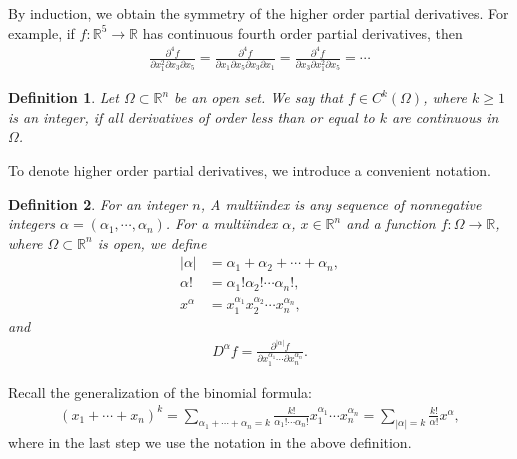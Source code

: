\documentclass[11pt]{book}
\newtheorem{definition}{Definition}[chapter]
\theoremstyle{definition}
\numberwithin{equation}{chapter}
\begin{document}
By induction, we obtain the symmetry of the higher order partial derivatives. For example, if $f: \mathbb{R}^5 \to \mathbb{R}$ has continuous fourth order partial derivatives, then
\begin{align*}
    \frac{\partial^4 f}{\partial x_1^2 \partial x_3 \partial x_5} = \frac{\partial^4 f}{\partial x_1 \partial x_5 \partial x_3 \partial x_1} = \frac{\partial^4 f}{\partial x_3 \partial x_1^2 \partial x_5} = \cdots
\end{align*}

\medskip

\begin{definition}
Let $\Omega \subset \mathbb{R}^n$ be an open set. We say that $f \in C^k(\Omega)$, where $k \geq 1$ is an integer, if all derivatives of order less than or equal to $k$ are continuous in $\Omega$.
\end{definition}

\medskip

To denote higher order partial derivatives, we introduce a convenient notation.

\medskip

\begin{definition}
For an integer $n$, A multiindex is any sequence of nonnegative integers $\alpha = (\alpha_1,\cdots,\alpha_n)$. For a multiindex $\alpha$, $x \in \mathbb{R}^n$ and a function $f: \Omega \to \mathbb{R}$, where $\Omega \subset \mathbb{R}^n$ is open, we define
\begin{align*}
    \left|\alpha\right| & = \alpha_1 + \alpha_2 + \cdots + \alpha_n, \\ \alpha! & = \alpha_1! \alpha_2! \cdots \alpha_n!, \\
    x^{\alpha} & = x_1^{\alpha_1} x_2^{\alpha_2} \cdots x_n^{\alpha_n},
\end{align*}
and
\begin{align*}
    D^{\alpha} f = \frac{\partial^{\left|\alpha\right|}f}{\partial x_1^{\alpha_1} \cdots \partial x_n^{\alpha_n}}.
\end{align*}
\end{definition}

\medskip

Recall the generalization of the binomial formula:
\begin{align*}
    (x_1 + \cdots + x_n)^k = \sum_{\alpha_1 + \cdots + \alpha_n = k} \frac{k!}{\alpha_1! \cdots \alpha_n!} x_1^{\alpha_1} \cdots x_n^{\alpha_n} = \sum_{\left|\alpha\right|=k} \frac{k!}{\alpha!} x^{\alpha},
\end{align*}
where in the last step we use the notation in the above definition.
\end{document}
